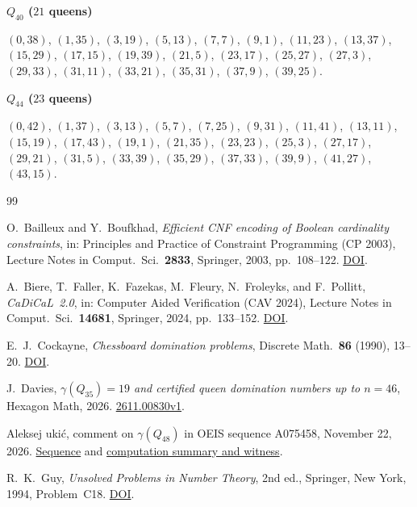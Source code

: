 \documentclass[11pt,a4paper]{article}
\theoremstyle{result}
\theoremstyle{definition}
\theoremstyle{remark}
\newenvironment{placement}[1]{%
  \par\addvspace{7pt}\begin{samepage}%
  \noindent\textbf{#1}\par\nobreak\noindent\ignorespaces
}{\par\end{samepage}}
\begin{document}
\begin{placement}{$Q_{40}$ ($21$ queens)}
$(0,38)$, $(1,35)$, $(3,19)$, $(5,13)$, $(7,7)$, $(9,1)$, $(11,23)$, $(13,37)$, $(15,29)$, $(17,15)$, $(19,39)$, $(21,5)$, $(23,17)$, $(25,27)$, $(27,3)$, $(29,33)$, $(31,11)$, $(33,21)$, $(35,31)$, $(37,9)$, $(39,25)$.
\end{placement}

\begin{placement}{$Q_{44}$ ($23$ queens)}
$(0,42)$, $(1,37)$, $(3,13)$, $(5,7)$, $(7,25)$, $(9,31)$, $(11,41)$, $(13,11)$, $(15,19)$, $(17,43)$, $(19,1)$, $(21,35)$, $(23,23)$, $(25,3)$, $(27,17)$, $(29,21)$, $(31,5)$, $(33,39)$, $(35,29)$, $(37,33)$, $(39,9)$, $(41,27)$, $(43,15)$.
\end{placement}

\clearpage
\begin{thebibliography}{99}
\small
\raggedright
\setlength{\itemsep}{4pt plus 1pt}

O.~Bailleux and Y.~Boufkhad,
\emph{Efficient CNF encoding of Boolean cardinality constraints},
in: Principles and Practice of Constraint Programming (CP 2003),
Lecture Notes in Comput.\ Sci.\ \textbf{2833}, Springer, 2003,
pp.~108--122.
\href{https://doi.org/10.1007/978-3-540-45193-8_8}{DOI}.

A.~Biere, T.~Faller, K.~Fazekas, M.~Fleury, N.~Froleyks, and F.~Pollitt,
\emph{CaDiCaL~2.0},
in: Computer Aided Verification (CAV 2024),
Lecture Notes in Comput.\ Sci.\ \textbf{14681}, Springer, 2024,
pp.~133--152.
\href{https://doi.org/10.1007/978-3-031-65627-9_7}{DOI}.

E.~J.~Cockayne,
\emph{Chessboard domination problems},
Discrete Math.\ \textbf{86} (1990), 13--20.
\href{https://doi.org/10.1016/0012-365X(90)90344-H}{DOI}.

J.~Davies,
\emph{$\gamma(Q_{35})=19$ and certified queen domination numbers up to $n=46$},
Hexagon Math, 2026.
\href{https://hexagonmath.org/2611.00830v1}{2611.00830v1}.

Aleksej \DJ uki\'c,
comment on $\gamma(Q_{48})$ in OEIS sequence A075458,
November 22, 2026.
\href{https://oeis.org/A075458}{Sequence}
and \href{https://oeis.org/A075458/a075458_1.txt}{computation summary and witness}.

R.~K.~Guy,
\emph{Unsolved Problems in Number Theory},
2nd ed., Springer, New York, 1994, Problem~C18.
\href{https://doi.org/10.1007/978-1-4899-3585-4}{DOI}.


\end{thebibliography}
\end{document}
